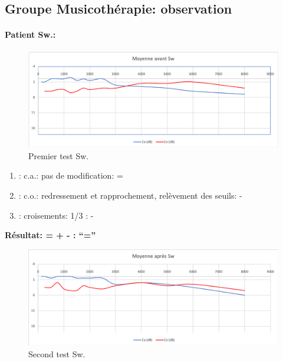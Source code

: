 \subsection*{Groupe Musicothérapie: observation}

\paragraph{ Patient Sw.:}



 \begin{figure}[th]
\centering
\includegraphics[width=1\linewidth]{images/graphiques/sw_pre.png}
\caption[ \textbf{Groupe Musicothérapie}: Patient Sw. : 1°Test]{Premier test Sw.}

\end{figure}

	\begin{enumerate}

 		\item : c.a.: pas de modification: = %

 		\item : c.o.: redressement et rapprochement,
                  relèvement des seuils: -       %
 		\item : croisements: 1/3 :  -

                \end{enumerate}

                \textbf{ Résultat:  = +  -        : ``=''}

                \begin{figure}[th]
\centering
\includegraphics[width=1\linewidth]{images/graphiques/sw_post.png}
\caption[Patient Sw.: 2° test]{Second test Sw.}

\end{figure}


